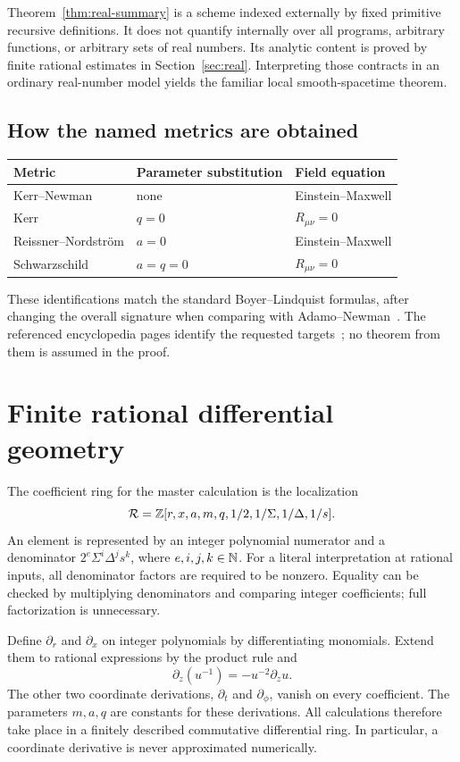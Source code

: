 \documentclass[11pt,a4paper]{article}
\numberwithin{equation}{section}
\theoremstyle{definition}\newtheorem{definition}[theorem]{Definition}
\theoremstyle{remark}\newtheorem{remark}[theorem]{Remark}
\begin{document}
Theorem~\ref{thm:real-summary} is a scheme indexed externally by fixed primitive recursive definitions. It does not quantify internally over all programs, arbitrary functions, or arbitrary sets of real numbers. Its analytic content is proved by finite rational estimates in Section~\ref{sec:real}. Interpreting those contracts in an ordinary real-number model yields the familiar local smooth-spacetime theorem.

\subsection{How the named metrics are obtained}
\begin{center}
\begin{tabular}{lll}\toprule
Metric & Parameter substitution & Field equation\\\midrule
Kerr--Newman & none & Einstein--Maxwell\\
Kerr & $q=0$ & $R_{\mu\nu}=0$\\
Reissner--Nordstr\"om & $a=0$ & Einstein--Maxwell\\
Schwarzschild & $a=q=0$ & $R_{\mu\nu}=0$\\\bottomrule
\end{tabular}
\end{center}
These identifications match the standard Boyer--Lindquist formulas, after changing the overall signature when comparing with Adamo--Newman~\cite{adamo}. The referenced encyclopedia pages identify the requested targets~\cite{wiki}; no theorem from them is assumed in the proof.

\section{Finite rational differential geometry}\label{sec:rational}

The coefficient ring for the master calculation is the localization
\begin{equation}\label{eq:ring}
 \mathcal R=\mathbb{Z}[r,x,a,m,q,1/2,1/\Sigma,1/\Delta,1/s].
\end{equation}
An element is represented by an integer polynomial numerator and a denominator
$2^e\Sigma^i\Delta^j s^k$, where $e,i,j,k\in\mathbb{N}$. For a literal interpretation at rational inputs, all denominator factors are required to be nonzero. Equality can be checked by multiplying denominators and comparing integer coefficients; full factorization is unnecessary.

Define $\partial_r$ and $\partial_x$ on integer polynomials by differentiating monomials. Extend them to rational expressions by the product rule and
\begin{equation}\label{eq:quotient}
 \partial_z(u^{-1})=-u^{-2}\partial_z u.
\end{equation}
The other two coordinate derivations, $\partial_t$ and $\partial_\phi$, vanish on every coefficient. The parameters $m,a,q$ are constants for these derivations. All calculations therefore take place in a finitely described commutative differential ring. In particular, a coordinate derivative is never approximated numerically.
\end{document}
